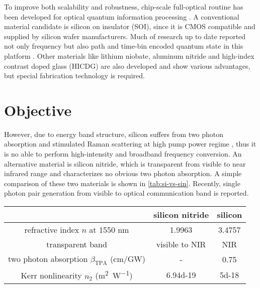 To improve both scalability and robustness, chip-scale full-optical routine has been developed for optical quantum information processing \cites{ Vahala2008, OBrien2009, Bonneau2016}.  
A conventional material candidate is silicon on insulator (SOI), since it is CMOS compatible and supplied by silicon wafer manufacturers. Much of research up to date reported not only frequency \cite{Kues2017b} but also path and time-bin encoded quantum state in this platform \cites{Paesani2018,Zhang2018a}. Other materials like lithium niobate, aluminum nitride and high-index contrast doped glass (HICDG) \cite{Sugiura2019} are also developed and show various advantages, but special fabrication technology is required.

\section{Objective}

However, due to energy band structure, silicon suffers from two photon absorption and stimulated Raman scattering at high pump power regime \cite{Engin2012}, thus it is no able to perform high-intensity and broadband frequency conversion. 
An alternative material is silicon nitride, which is transparent from visible to near infrared range and characterizes no obvious two photon absorption.
A simple comparison of these two materials is shown in \autoref{tab:si-vs-sin}.
Recently, single photon pair generation from visible to optical communication band is reported\cite{Lu2016}. 

\begin{table}[]
	\label{tab:si-vs-sin}
	\begin{tabular}{ccc}
							& silicon nitride 			& silicon		 			\\ \hline
		refractive index $n$ at 1550 nm
							& 1.9963					& 3.4757						\\ \hline
		transparent band 	& visible to NIR			& NIR					    \\ \hline
		two photon absorption $ \beta_\mathrm{TPA} $ (cm/GW)                 
							& - 						& 0.75 			 			\\ \hline
		Kerr nonlinearity $ n_2 $ (\si{\square\meter\per\watt})             
							& \num{6.94d-19} 			& \num{5d-18} 				\\ \hline
	\end{tabular}
\end{table}

